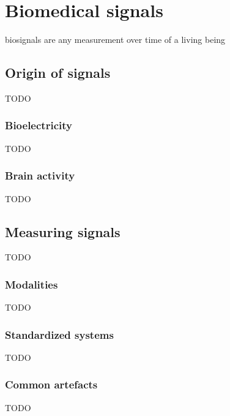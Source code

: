 
\chapter{Biomedical signals}
\label{ch:biomedical_signals}

\Glspl{biosignal} are any measurement over time of a living being

\section{Origin of signals}
\label{sec:biomedical_signals_origin}
TODO

\subsection{Bioelectricity}
\label{subsec:biomedical_signals_origin_bioelectricity}
TODO

\subsection{Brain activity}
\label{subsec:biomedical_signals_origin_brain_activity}
TODO

\section{Measuring signals}
\label{sec:biomedical_signals_measuring}
TODO

\subsection{Modalities}
\label{subsec:biomedical_signals_measuring_modalities}
TODO

\subsection{Standardized systems}
\label{subsec:biomedical_signals_measuring_standardization}
TODO

\subsection{Common artefacts}
\label{subsec:biomedical_signals_measuring_artefacts}
TODO